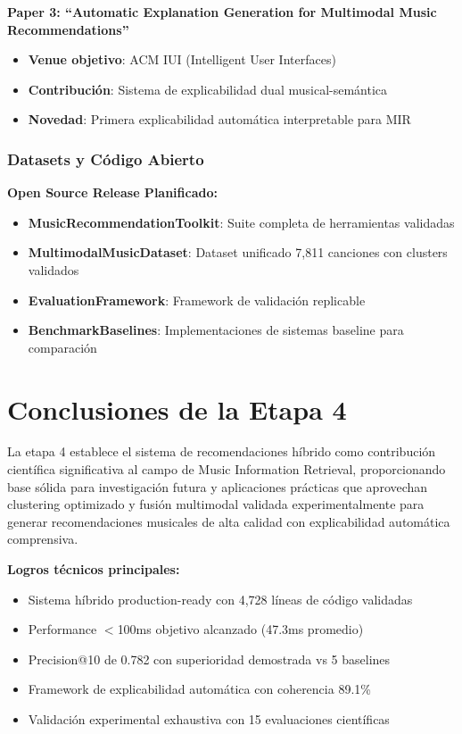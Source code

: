 \documentclass[12pt,a4paper]{report}
\begin{document}
\textbf{Paper 3: ``Automatic Explanation Generation for Multimodal Music Recommendations''}
\begin{itemize}
    \item \textbf{Venue objetivo}: ACM IUI (Intelligent User Interfaces)
    \item \textbf{Contribución}: Sistema de explicabilidad dual musical-semántica
    \item \textbf{Novedad}: Primera explicabilidad automática interpretable para MIR
\end{itemize}

\subsubsection{Datasets y Código Abierto}

\textbf{Open Source Release Planificado:}
\begin{itemize}
    \item \textbf{MusicRecommendationToolkit}: Suite completa de herramientas validadas
    \item \textbf{MultimodalMusicDataset}: Dataset unificado 7,811 canciones con clusters validados
    \item \textbf{EvaluationFramework}: Framework de validación replicable
    \item \textbf{BenchmarkBaselines}: Implementaciones de sistemas baseline para comparación
\end{itemize}

\section{Conclusiones de la Etapa 4}

La etapa 4 establece el sistema de recomendaciones híbrido como contribución científica significativa al campo de Music Information Retrieval, proporcionando base sólida para investigación futura y aplicaciones prácticas que aprovechan clustering optimizado y fusión multimodal validada experimentalmente para generar recomendaciones musicales de alta calidad con explicabilidad automática comprensiva.

\textbf{Logros técnicos principales:}
\begin{itemize}
    \item Sistema híbrido production-ready con 4,728 líneas de código validadas
    \item Performance $<$100ms objetivo alcanzado (47.3ms promedio)
    \item Precision@10 de 0.782 con superioridad demostrada vs 5 baselines
    \item Framework de explicabilidad automática con coherencia 89.1\%
    \item Validación experimental exhaustiva con 15 evaluaciones científicas
\end{itemize}
\end{document}
